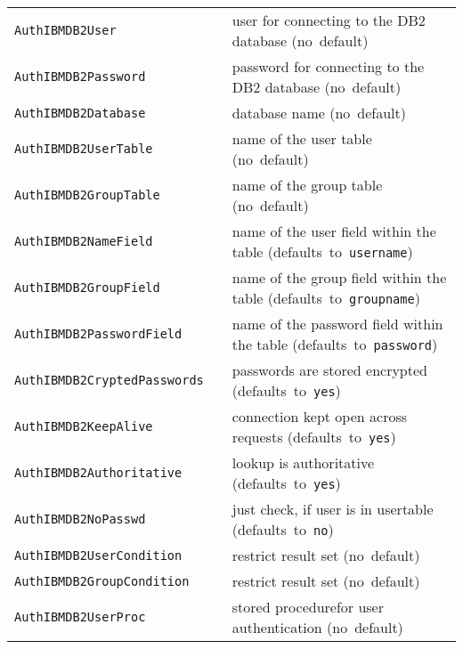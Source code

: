 \documentclass[11pt,a4paper]{article}
\begin{document}
\begin{tabular}{@{} ll >{\raggedright\arraybackslash}p{ 50ex } @{}}
{\tt AuthIBMDB2User} & & user for connecting to the DB2 database \mbox{(no default)} \\

{\tt AuthIBMDB2Password} & & password for connecting to the DB2 database \mbox{(no default)} \\

{\tt AuthIBMDB2Database} & & database name \mbox{(no default)} \\

{\tt AuthIBMDB2UserTable} & & name of the user table \mbox{(no default)} \\

{\tt AuthIBMDB2GroupTable} & & name of the group table \mbox{(no default)} \\

{\tt AuthIBMDB2NameField} & & name of the user field within the table \mbox{(defaults to {\tt username})} \\

{\tt AuthIBMDB2GroupField} & & name of the group field within the table \mbox{(defaults to {\tt groupname})} \\

{\tt AuthIBMDB2PasswordField} & & name of the password field within the table \mbox{(defaults to {\tt password})} \\

{\tt AuthIBMDB2CryptedPasswords} & & passwords are stored encrypted \mbox{(defaults to {\tt yes})} \\

{\tt AuthIBMDB2KeepAlive} & & connection kept open across requests \mbox{(defaults to {\tt yes})} \\

{\tt AuthIBMDB2Authoritative} & & lookup is authoritative \mbox{(defaults to {\tt yes})} \\ 

{\tt AuthIBMDB2NoPasswd} & & just check, if user is in usertable \mbox{(defaults to {\tt no})} \\

{\tt AuthIBMDB2UserCondition} & & restrict result set \mbox{(no default)} \\

{\tt AuthIBMDB2GroupCondition} & & restrict result set \mbox{(no default)} \\

{\tt AuthIBMDB2UserProc} & & stored procedure\footnotemark[2] for user authentication \mbox{(no default)} \\


\end{tabular}
\end{document}
